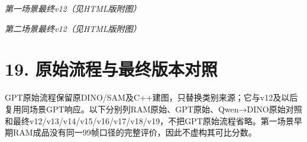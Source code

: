 \documentclass[UTF8,fontset=fandol]{ctexart}
\begin{document}
\textit{第一场景最终v12（见HTML版附图）}



\textit{第二场景最终v12（见HTML版附图）}



\section*{19. 原始流程与最终版本对照}

GPT原始流程保留原DINO/SAM及C++建图，只替换类别来源；它与v12及以后复用同场景GPT响应。以下分别列RAM原始、GPT原始、Qwen→DINO原始对照和最终v12/v13/v14/v15/v16/v17/v18/v19，不把GPT原始流程省略。第一场景早期RAM成品没有同一99帧口径的完整评价，因此不虚构其可比分数。
\end{document}
